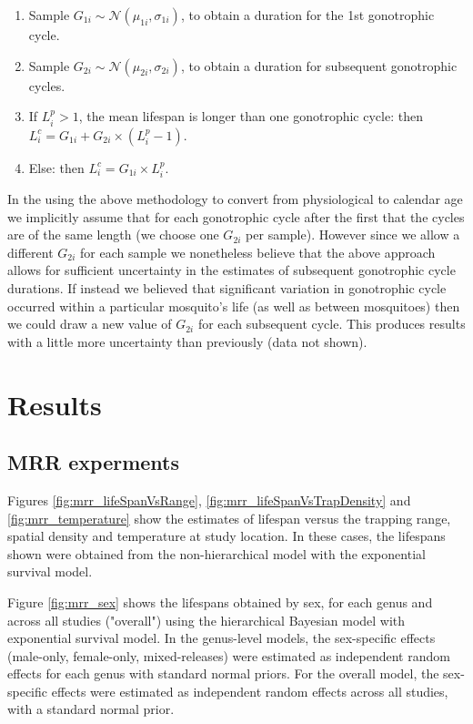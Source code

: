 \documentclass[12pt]{article}
\begin{document}
{\begin{enumerate}
	\item Sample $G_{1i} \sim \mathcal{N}(\mu_{1i},\sigma_{1i})$, to obtain a duration for the 1st gonotrophic cycle.
	\item Sample $G_{2i} \sim \mathcal{N}(\mu_{2i},\sigma_{2i})$, to obtain a duration for subsequent gonotrophic cycles.
	\item If $L^p_i > 1$, the mean lifespan is longer than one gonotrophic cycle:
	\subitem then $L^c_i = G_{1i} + G_{2i} \times (L^p_i - 1)$.
	\item Else:
	\subitem then $L^c_i = G_{1i}\times L^p_i$.
\end{enumerate}

In the using the above methodology to convert from physiological to calendar age we implicitly assume that for each gonotrophic cycle after the first that the cycles are of the same length (we choose one $G_{2i}$ per sample). However since we allow a different $G_{2i}$ for each sample we nonetheless believe that the above approach allows for sufficient uncertainty in the estimates of subsequent gonotrophic cycle durations. If instead we believed that significant variation in gonotrophic cycle occurred within a particular mosquito's life (as well as between mosquitoes) then we could draw a new value of $G_{2i}$ for each subsequent cycle. This produces results with a little more uncertainty than previously (data not shown).

\section{Results}
\subsection{MRR experments}
Figures \ref{fig:mrr_lifeSpanVsRange}, \ref{fig:mrr_lifeSpanVsTrapDensity} and \ref{fig:mrr_temperature} show the estimates of lifespan versus the trapping range, spatial density and temperature at study location. In these cases, the lifespans shown were obtained from the non-hierarchical model with the exponential survival model.

Figure \ref{fig:mrr_sex} shows the lifespans obtained by sex, for each genus and across all studies ("overall") using the hierarchical Bayesian model with exponential survival model. In the genus-level models, the sex-specific effects (male-only, female-only, mixed-releases) were estimated as independent random effects for each genus with standard normal priors. For the overall model, the sex-specific effects were estimated as independent random effects across all studies, with a standard normal prior.

}
\end{document}
